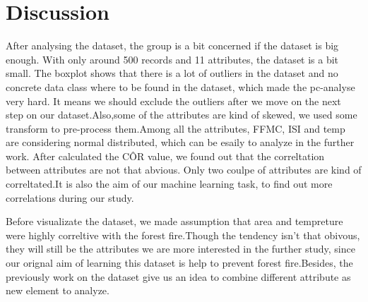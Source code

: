 \section{Discussion}
After analysing the dataset, the group is a bit concerned if the dataset is big enough. With only around 500 records and 11 attributes, the dataset is a bit small. The boxplot shows that there is a lot of outliers in the dataset and no concrete data class where to be found in the dataset, which made the pc-analyse very hard. It means we should exclude the outliers after we move on the next step on our dataset.Also,some of the attributes are kind of skewed, we used some transform to pre-process them.Among all the attributes, FFMC, ISI and temp are considering normal distributed, which can be esaily to analyze in the further work. After calculated the C\^{O}R value, we found out that the correltation between attributes are not that abvious. Only two coulpe of attributes are kind of correltated.It is also the aim of our machine learning task, to find out more correlations during our study.  

Before  visualizate the dataset, we made assumption that area and tempreture were highly correltive with the forest fire.Though the tendency isn't that obivous, they will still be the attributes we are more interested in the further study, since our orignal aim of learning this dataset is help to prevent forest fire.Besides, the previously work on the dataset give us an idea to combine different attribute as new element to analyze. 